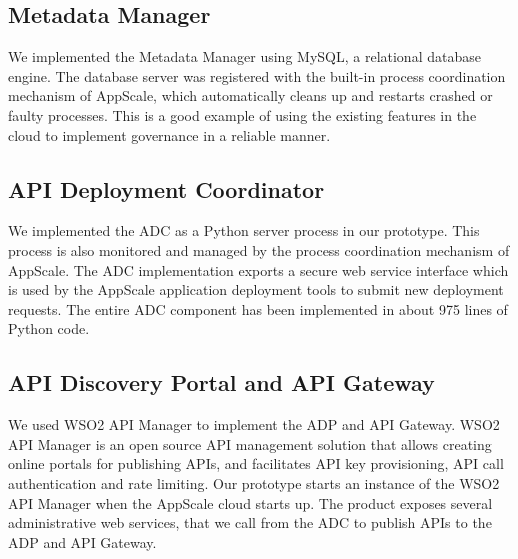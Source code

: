 \subsection{Metadata Manager}
We implemented the Metadata Manager using MySQL, a relational database engine. 
The database server was registered with the built-in process coordination mechanism of AppScale, which automatically
cleans up and restarts crashed or faulty processes. This is a good example of using the existing features in the cloud to implement
governance in a reliable manner.

\subsection{API Deployment Coordinator}
We implemented the ADC as a Python server process in our prototype. This process is also monitored and managed by the process
coordination mechanism of AppScale. The ADC implementation exports a secure web service interface which is used by the AppScale application 
deployment tools to submit new deployment requests. The entire ADC component has been implemented in about 975 lines of Python code. 

\subsection{API Discovery Portal and API Gateway}
We used WSO2 API Manager to implement the ADP and API Gateway. WSO2 API Manager is an open source API management solution that
allows creating online portals for publishing APIs, and facilitates API key provisioning, API call authentication and rate limiting. 
Our prototype starts an instance of the WSO2 API Manager when
the AppScale cloud starts up. The product exposes several
administrative web services, that we call from the ADC to publish APIs to the ADP and API Gateway. 
